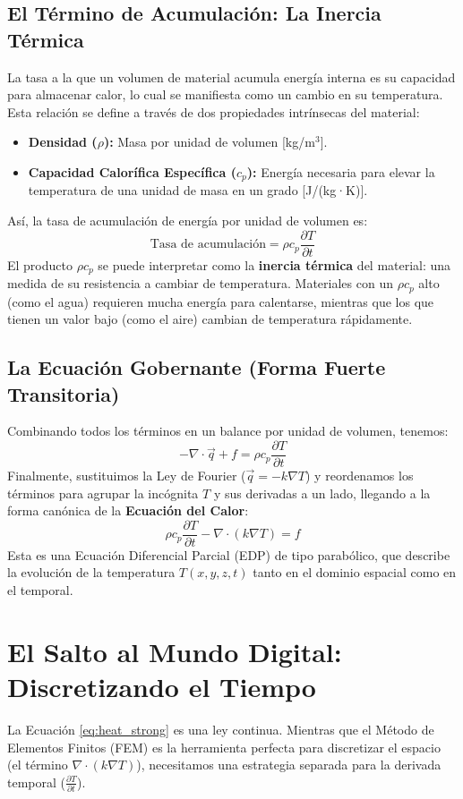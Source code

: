\documentclass[11pt, a4paper]{article}
\begin{document}
\subsection{El Término de Acumulación: La Inercia Térmica}
La tasa a la que un volumen de material acumula energía interna es su capacidad para almacenar calor, lo cual se manifiesta como un cambio en su temperatura. Esta relación se define a través de dos propiedades intrínsecas del material:
\begin{itemize}
    \item \textbf{Densidad ($\rho$):} Masa por unidad de volumen [kg/m$^3$].
    \item \textbf{Capacidad Calorífica Específica ($c_p$):} Energía necesaria para elevar la temperatura de una unidad de masa en un grado [J/(kg·K)].
\end{itemize}
Así, la tasa de acumulación de energía por unidad de volumen es:
\begin{equation}
    \text{Tasa de acumulación} = \rho c_p \frac{\partial T}{\partial t}
\end{equation}
El producto $\rho c_p$ se puede interpretar como la \textbf{inercia térmica} del material: una medida de su resistencia a cambiar de temperatura. Materiales con un $\rho c_p$ alto (como el agua) requieren mucha energía para calentarse, mientras que los que tienen un valor bajo (como el aire) cambian de temperatura rápidamente.

\subsection{La Ecuación Gobernante (Forma Fuerte Transitoria)}
Combinando todos los términos en un balance por unidad de volumen, tenemos:
$$ - \nabla \cdot \vec{q} + f = \rho c_p \frac{\partial T}{\partial t} $$
Finalmente, sustituimos la Ley de Fourier ($\vec{q} = -k \nabla T$) y reordenamos los términos para agrupar la incógnita $T$ y sus derivadas a un lado, llegando a la forma canónica de la \textbf{Ecuación del Calor}:
\begin{equation}
    \rho c_p \frac{\partial T}{\partial t} - \nabla \cdot (k \nabla T) = f
    \label{eq:heat_strong}
\end{equation}
Esta es una Ecuación Diferencial Parcial (EDP) de tipo parabólico, que describe la evolución de la temperatura $T(x,y,z,t)$ tanto en el dominio espacial como en el temporal.

\newpage

\section{El Salto al Mundo Digital: Discretizando el Tiempo}
La Ecuación \ref{eq:heat_strong} es una ley continua. Mientras que el Método de Elementos Finitos (FEM) es la herramienta perfecta para discretizar el espacio (el término $\nabla \cdot (k \nabla T)$), necesitamos una estrategia separada para la derivada temporal ($\frac{\partial T}{\partial t}$).
\end{document}
